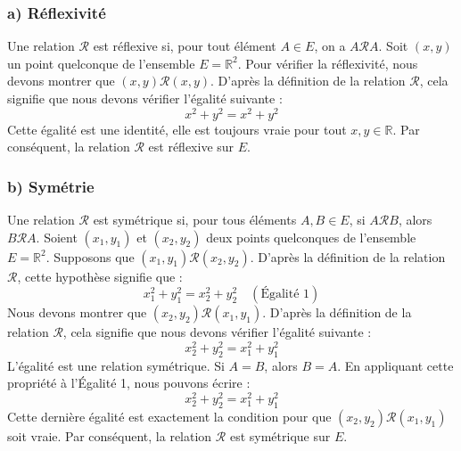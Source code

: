 \documentclass{report}
\begin{document}
\subsubsection*{a) Réflexivité}
Une relation $\mathcal{R}$ est réflexive si, pour tout élément $A \in E$, on a $A \mathcal{R} A$.
Soit $(x, y)$ un point quelconque de l'ensemble $E = \mathbb{R}^2$.
Pour vérifier la réflexivité, nous devons montrer que $(x, y) \mathcal{R} (x, y)$.
D'après la définition de la relation $\mathcal{R}$, cela signifie que nous devons vérifier l'égalité suivante :
$$ x^2 + y^2 = x^2 + y^2 $$
Cette égalité est une identité, elle est toujours vraie pour tout $x, y \in \mathbb{R}$.
Par conséquent, la relation $\mathcal{R}$ est réflexive sur $E$.

\subsubsection*{b) Symétrie}
Une relation $\mathcal{R}$ est symétrique si, pour tous éléments $A, B \in E$, si $A \mathcal{R} B$, alors $B \mathcal{R} A$.
Soient $(x_1, y_1)$ et $(x_2, y_2)$ deux points quelconques de l'ensemble $E = \mathbb{R}^2$.
Supposons que $(x_1, y_1) \mathcal{R} (x_2, y_2)$.
D'après la définition de la relation $\mathcal{R}$, cette hypothèse signifie que :
$$ x_1^2 + y_1^2 = x_2^2 + y_2^2 \quad (\text{Égalité 1}) $$
Nous devons montrer que $(x_2, y_2) \mathcal{R} (x_1, y_1)$.
D'après la définition de la relation $\mathcal{R}$, cela signifie que nous devons vérifier l'égalité suivante :
$$ x_2^2 + y_2^2 = x_1^2 + y_1^2 $$
L'égalité est une relation symétrique. Si $A=B$, alors $B=A$. En appliquant cette propriété à l'Égalité 1, nous pouvons écrire :
$$ x_2^2 + y_2^2 = x_1^2 + y_1^2 $$
Cette dernière égalité est exactement la condition pour que $(x_2, y_2) \mathcal{R} (x_1, y_1)$ soit vraie.
Par conséquent, la relation $\mathcal{R}$ est symétrique sur $E$.
\end{document}
